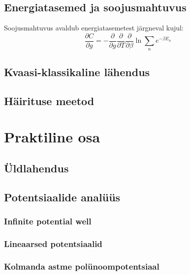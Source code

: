 \documentclass{trkut}%
\begin{document}
\section{Energiatasemed ja soojusmahtuvus}

Soojusmahtuvus avaldub energiatasemetest järgneval kujul:
\begin{equation}
    \frac{\partial C}{\partial g}=- \frac{\partial}{\partial g}  \frac{\partial}{\partial T} \frac{\partial}{\partial \beta} \ln {\sum_{n} e^{-\beta E_n}}
\end{equation}

\section{Kvaasi-klassikaline lähendus}

\section{Häirituse meetod}


\chapter{Praktiline osa}


\section{Üldlahendus}

\section{Potentsiaalide analüüs}

\subsection{Infinite potential well}

\subsection{Lineaarsed potentsiaalid}

\subsection{Kolmanda astme polünoompotentsiaal}



\printbibliography
\appendix
\kinnitusleht
\end{document}
